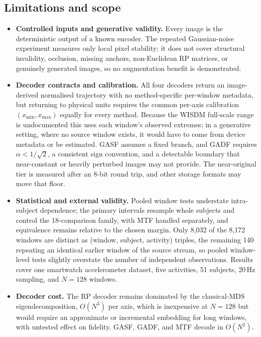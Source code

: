 \documentclass[preprint,12pt]{elsarticle}
\begin{document}
\subsection{Limitations and scope}\label{sec:disc_scope}
\begin{itemize}
\item \textbf{Controlled inputs and generative validity.} Every image is the deterministic output of a known encoder. The repeated Gaussian-noise experiment measures only local pixel stability; it does not cover structural invalidity, occlusion, missing anchors, non-Euclidean RP matrices, or genuinely generated images, so no augmentation benefit is demonstrated.
\item \textbf{Decoder contracts and calibration.} All four decoders return an image-derived normalised trajectory with no method-specific per-window metadata, but returning to physical units requires the common per-axis calibration \((x_{\min},x_{\max})\) equally for every method. Because the WISDM full-scale range is undocumented this uses each window's observed extremes; in a generative setting, where no source window exists, it would have to come from device metadata or be estimated. GASF assumes a fixed branch, and GADF requires \(\alpha<1/\sqrt2\), a consistent sign convention, and a detectable boundary that near-constant or heavily perturbed images may not provide. The near-original tier is measured after an 8-bit round trip, and other storage formats may move that floor.
\item \textbf{Statistical and external validity.} Pooled window tests understate intra-subject dependence; the primary intervals resample whole subjects and control the 18-comparison family, with MTF handled separately, and equivalence remains relative to the chosen margin. Only 8,032 of the 8,172 windows are distinct as (window, subject, activity) triples, the remaining 140 repeating an identical earlier window of the source stream, so pooled window-level tests slightly overstate the number of independent observations. Results cover one smartwatch accelerometer dataset, five activities, 51 subjects, 20\,Hz sampling, and \(N=128\) windows.
\item \textbf{Decoder cost.} The RP decoder remains dominated by the classical-MDS eigendecomposition, \(O(N^3)\) per axis, which is inexpensive at \(N=128\) but would require an approximate or incremental embedding for long windows, with untested effect on fidelity. GASF, GADF, and MTF decode in \(O(N^2)\).
\end{itemize}
\end{document}
